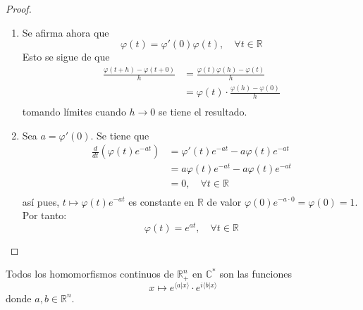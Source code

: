 \documentclass[12pt]{report}
\newcounter{it}
\theoremstyle{largebreak}
\newcommand\pint[2]{\ensuremath{\langle#1| #2\rangle}}
\begin{document}
\begin{proof}
\begin{enumerate}
            \item Se afirma ahora que
            \begin{equation*}
                \varphi(t)=\varphi'(0)\varphi(t),\quad\forall t\in\mathbb{R}
            \end{equation*}
            Esto se sigue de que
            \begin{equation*}
                \begin{split}
                    \frac{\varphi(t+h)-\varphi(t+0)}{h}&=\frac{\varphi(t)\varphi(h)-\varphi(t)}{h}\\
                    &=\varphi(t)\cdot\frac{\varphi(h)-\varphi(0)}{h}\\
                \end{split}
            \end{equation*}
            tomando límites cuando $h\rightarrow0$ se tiene el resultado.
            \item Sea $a=\varphi'(0)$. Se tiene que
            \begin{equation*}
                \begin{split}
                    \frac{d}{dt}\left(\varphi(t)e^{-at} \right)&=\varphi'(t)e^{-at}-a\varphi(t)e^{-at}\\
                    &=a\varphi(t)e^{-at}-a\varphi(t)e^{-at}\\
                    &=0,\quad\forall t\in\mathbb{R}\\
                \end{split}
            \end{equation*}
            así pues, $t\mapsto\varphi(t)e^{-at}$ es constante en $\mathbb{R}$ de valor $\varphi(0)e^{-a\cdot0}=\varphi(0)=1$. Por tanto:
            \begin{equation*}
                \varphi(t)=e^{at},\quad\forall t\in\mathbb{R}
            \end{equation*}
        \end{enumerate}
    \end{proof}

    \begin{theor}
        Todos los homomorfismos continuos de $\mathbb{R}_+^n$ en $\mathbb{C}^*$ son las funciones
        \begin{equation*}
            x\mapsto e^{\pint{a}{x}}\cdot e^{i\pint{b}{x}}
        \end{equation*}
        donde $a,b\in\mathbb{R}^n$.
    \end{theor}
\end{document}
